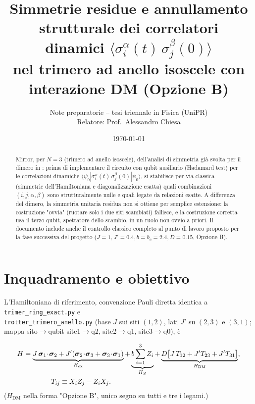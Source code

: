 \documentclass[11pt,a4paper]{article}
\title{Simmetrie residue e annullamento strutturale dei correlatori\\
dinamici $\langle\sigma_i^\alpha(t)\,\sigma_j^\beta(0)\rangle$\\[2pt]
\large nel trimero ad anello isoscele con interazione DM (Opzione B)}
\author{Note preparatorie -- tesi triennale in Fisica (UniPR)\\
Relatore: Prof.\ Alessandro Chiesa}
\date{\today}
\begin{document}
\maketitle

\begin{abstract}
\noindent
Mirror, per $N=3$ (trimero ad anello isoscele), dell'analisi di simmetria già svolta per il
dimero in \texttt{}: prima di implementare il
circuito con qubit ausiliario (Hadamard test) per le correlazioni dinamiche
$\langle\psi_0|\sigma_i^\alpha(t)\,\sigma_j^\beta(0)|\psi_0\rangle$, si stabilisce per via
classica (simmetrie dell'Hamiltoniana e diagonalizzazione esatta) quali combinazioni
$(i,j,\alpha,\beta)$ sono strutturalmente nulle e quali legate da relazioni esatte. A differenza
del dimero, la simmetria unitaria residua non si ottiene per semplice estensione: la
costruzione "ovvia" (ruotare solo i due siti scambiati) fallisce, e la costruzione corretta usa
il terzo qubit, spettatore dello scambio, in un ruolo non ovvio a priori. Il documento include
anche il controllo classico completo al punto di lavoro proposto per la fase successiva
del progetto ($J{=}1,J'{=}0.4,b{=}b_c{=}2.4,D{=}0.15$, Opzione B).
\end{abstract}

\tableofcontents

\section{Inquadramento e obiettivo}

L'Hamiltoniana di riferimento, convenzione Pauli diretta identica a
\texttt{trimer\_ring\_exact.py} e\\ \texttt{trotter\_trimero\_anello.py} (base $J$ sui
siti $(1,2)$, lati $J'$ su $(2,3)$ e $(3,1)$; mappa sito$\to$qubit
site1$\to$q2, site2$\to$q1, site3$\to$q0), è

\begin{align}
H &= \underbrace{J\,\boldsymbol\sigma_1\!\cdot\!\boldsymbol\sigma_2
  + J'(\boldsymbol\sigma_2\!\cdot\!\boldsymbol\sigma_3+\boldsymbol\sigma_3\!\cdot\!\boldsymbol\sigma_1)}_{H_{\mathrm{ex}}}
  + \underbrace{b\sum_{i=1}^3 Z_i}_{H_Z}
  + \underbrace{D\big[J\,T_{12}+J'T_{23}+J'T_{31}\big]}_{H_{\mathrm{DM}}},\notag\\
&\qquad\qquad T_{ij}\equiv X_iZ_j-Z_iX_j.
\label{eq:H}
\end{align}
($H_{\mathrm{DM}}$ nella forma "Opzione B", unico segno su tutti e tre i legami.)
\end{document}
